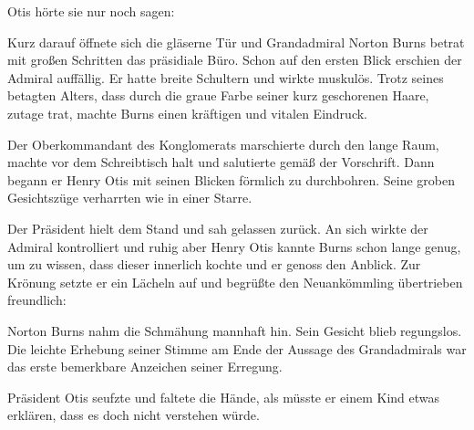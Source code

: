 Otis hörte sie nur noch sagen: 

\par

Kurz darauf öffnete sich die gläserne Tür und Grandadmiral Norton Burns betrat mit großen Schritten das präsidiale Büro. Schon auf den ersten Blick erschien der Admiral auffällig. Er hatte breite Schultern und wirkte muskulös. Trotz seines betagten Alters, dass durch die graue Farbe seiner kurz geschorenen Haare, zutage trat, machte Burns einen kräftigen und vitalen Eindruck.

\par

Der Oberkommandant des Konglomerats marschierte durch den lange Raum, machte vor dem Schreibtisch halt und salutierte gemäß der Vorschrift. Dann begann er Henry Otis mit seinen Blicken förmlich zu durchbohren. Seine groben Gesichtszüge verharrten wie in einer Starre.

\par

Der Präsident hielt dem Stand und sah gelassen zurück. An sich wirkte der Admiral kontrolliert und ruhig aber Henry Otis kannte Burns schon lange genug, um zu wissen, dass dieser innerlich kochte und er genoss den Anblick. Zur Krönung setzte er ein Lächeln auf und begrüßte den Neuankömmling übertrieben freundlich: 

\par

Norton Burns nahm die Schmähung mannhaft hin. Sein Gesicht blieb regungslos.  Die leichte Erhebung seiner Stimme am Ende der Aussage des Grandadmirals war das erste bemerkbare Anzeichen seiner Erregung.

\par

Präsident Otis seufzte und faltete die Hände, als müsste er einem Kind etwas erklären, dass es doch nicht verstehen würde. 

\par

